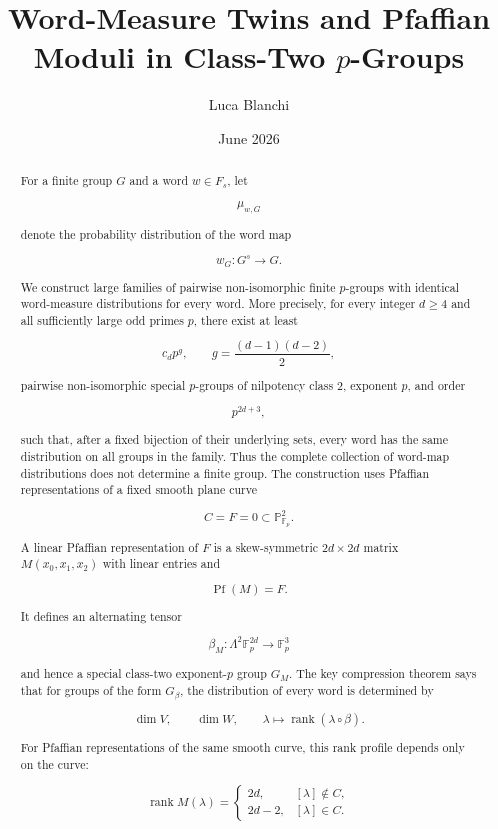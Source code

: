 \documentclass[11pt]{article}
\title{Word-Measure Twins and Pfaffian Moduli in Class-Two $p$-Groups}
\author{Luca Blanchi}
\date{June 2026}
\begin{document}
\maketitle

\begin{abstract}
For a finite group $G$ and a word $w\in F_s$, let

\[
\mu_{w,G}
\]

denote the probability distribution of the word map

\[
w_G:G^s\to G.
\]

We construct large families of pairwise non-isomorphic finite $p$-groups with identical word-measure distributions for every word. More precisely, for every integer $d\ge4$ and all sufficiently large odd primes $p$, there exist at least

\[
c_d p^g,
\qquad
g=\frac{(d-1)(d-2)}2,
\]

pairwise non-isomorphic special $p$-groups of nilpotency class $2$, exponent $p$, and order

\[
p^{2d+3},
\]

such that, after a fixed bijection of their underlying sets, every word has the same distribution on all groups in the family. Thus the complete collection of word-map distributions does not determine a finite group. The construction uses Pfaffian representations of a fixed smooth plane curve

\[
C={F=0}\subset\mathbb P^2_{\mathbb F_p}.
\]

A linear Pfaffian representation of $F$ is a skew-symmetric $2d\times 2d$ matrix $M(x_0,x_1,x_2)$ with linear entries and

\[
\operatorname{Pf}(M)=F.
\]

It defines an alternating tensor

\[
\beta_M:\Lambda^2\mathbb F_p^{2d}\to\mathbb F_p^3
\]

and hence a special class-two exponent-$p$ group $G_M$. The key compression theorem says that for groups of the form $G_\beta$, the distribution of every word is determined by

\[
\dim V,\qquad \dim W,\qquad
\lambda\mapsto\operatorname{rank}(\lambda\circ\beta).
\]

For Pfaffian representations of the same smooth curve, this rank profile depends only on the curve:

\[
\operatorname{rank}M(\lambda)
=\begin{cases}
2d, & [\lambda]\notin C,\\
2d-2, & [\lambda]\in C.
\end{cases}
\]


\end{abstract}
\end{document}
